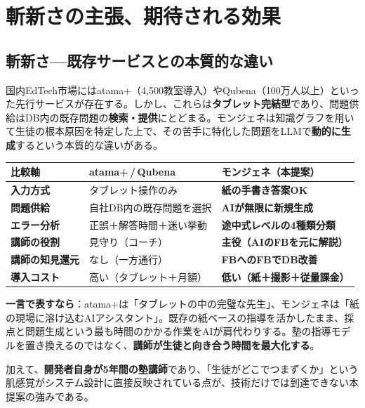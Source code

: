 \documentclass[paper=a4,fontsize=10.5bp,jafontsize=10.5bp,twocolumn]{jlreq}
\begin{document}
\section{斬新さの主張、期待される効果}

\subsection{斬新さ---既存サービスとの本質的な違い}

国内EdTech市場にはatama+（4,500教室導入）やQubena（100万人以上）といった先行サービスが存在する。しかし、これらは\textbf{タブレット完結型}であり、問題供給はDB内の既存問題の\textbf{検索・提供}にとどまる。モンジェネは知識グラフを用いて生徒の根本原因を特定した上で、その苦手に特化した問題をLLMで\textbf{動的に生成}するという本質的な違いがある。


\begin{footnotesize}\noindent
\begin{tabularx}{\linewidth}{>{\bfseries}l X X}
\toprule
比較軸 & atama+\,/\,Qubena & モンジェネ（本提案） \\
\midrule
入力方式 & タブレット操作のみ & \textbf{紙の手書き答案OK} \\
問題供給 & 自社DB内の既存問題を選択 & \textbf{AIが無限に新規生成} \\
エラー分析 & 正誤＋解答時間＋迷い挙動 & \textbf{途中式レベルの4種類分類} \\
講師の役割 & 見守り（コーチ） & \textbf{主役（AIのFBを元に解説）} \\
講師の知見還元 & なし（一方通行） & \textbf{FBへのFBでDB改善} \\
導入コスト & 高い（タブレット＋月額） & \textbf{低い（紙＋撮影＋従量課金）} \\
\bottomrule
\end{tabularx}
\end{footnotesize}


\begin{highlightbox}
\textbf{一言で表すなら}：atama+は「タブレットの中の完璧な先生」、モンジェネは「紙の現場に溶け込むAIアシスタント」。既存の紙ベースの指導を活かしたまま、採点と問題生成という最も時間のかかる作業をAIが肩代わりする。塾の指導モデルを置き換えるのではなく、\textbf{講師が生徒と向き合う時間を最大化する}。
\end{highlightbox}

\noindent
加えて、\textbf{開発者自身が5年間の塾講師}であり、「生徒がどこでつまずくか」という肌感覚がシステム設計に直接反映されている点が、技術だけでは到達できない本提案の強みである。
\end{document}
